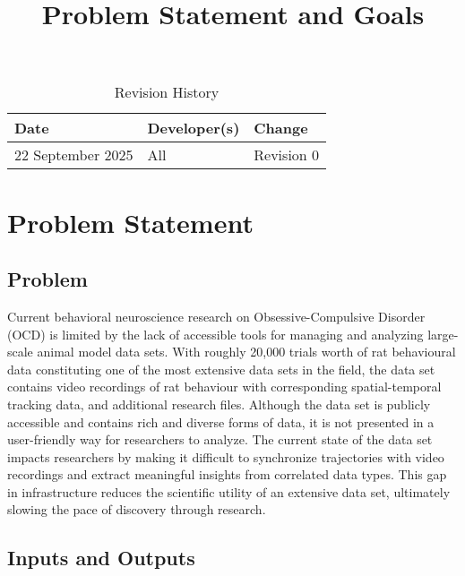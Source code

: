 \documentclass{article}
\title{Problem Statement and Goals\\\progname}
\author{\authname}
\date{}
\begin{document}
\maketitle

\begin{table}[hp]
\caption{Revision History} \label{TblRevisionHistory}
\begin{tabularx}{\textwidth}{llX}
\toprule
\textbf{Date} & \textbf{Developer(s)} & \textbf{Change}\\
\midrule
22 September 2025& All & Revision 0\\
\bottomrule
\end{tabularx}
\end{table}

\section{Problem Statement}



\subsection{Problem}

\par{Current behavioral neuroscience research on Obsessive-Compulsive Disorder (OCD) is limited by the lack of 
accessible tools for managing and analyzing large-scale animal model data sets. With roughly 20,000 trials worth 
of rat behavioural data constituting one of the most extensive data sets in the field, the data set contains 
video recordings of rat behaviour with corresponding spatial-temporal tracking data, and additional research files. 
Although the data set is publicly accessible and contains rich and diverse forms of data, it is not presented in a 
user-friendly way for researchers to analyze. The current state of the data set impacts researchers by making it 
difficult to synchronize trajectories with video recordings and extract meaningful insights from correlated data types. 
This gap in infrastructure reduces the scientific utility of an extensive data set, ultimately slowing the pace of 
discovery through research.}

\subsection{Inputs and Outputs}
\end{document}
